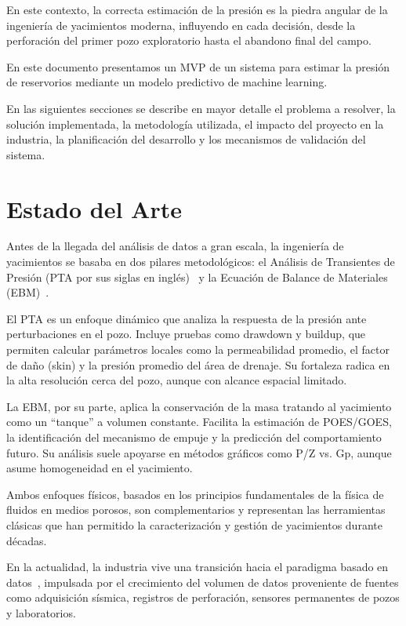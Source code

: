 \documentclass[12pt,a4paper]{article}
\begin{document}
En este contexto, la correcta estimación de la presión es la piedra angular de la ingeniería de
yacimientos moderna, influyendo en cada decisión, desde la perforación del primer pozo exploratorio hasta
el abandono final del campo.

En este documento presentamos un MVP de un sistema para estimar la presión de reservorios mediante
un modelo predictivo de machine learning.

En las siguientes secciones se describe en mayor detalle el problema a resolver, la solución implementada,
la metodología utilizada, el impacto del proyecto en la industria, la planificación del desarrollo y los
mecanismos de validación del sistema.

\newpage
\section{Estado del Arte}

Antes de la llegada del análisis de datos a gran escala, la ingeniería de yacimientos se basaba en dos
pilares metodológicos: el Análisis de Transientes de Presión (PTA por sus siglas en inglés)~\cite{pta} y la
Ecuación de Balance de Materiales (EBM)~\cite{mbe}.

El PTA es un enfoque dinámico que analiza la respuesta de la presión ante perturbaciones en el pozo.
Incluye pruebas como drawdown y buildup, que permiten calcular parámetros locales como la permeabilidad
promedio, el factor de daño (skin) y la presión promedio del área de drenaje. Su fortaleza radica en la
alta resolución cerca del pozo, aunque con alcance espacial limitado.

La EBM, por su parte, aplica la conservación de la masa tratando al yacimiento como un ``tanque'' a volumen
constante. Facilita la estimación de POES/GOES, la identificación del mecanismo de empuje y la predicción
del comportamiento futuro. Su análisis suele apoyarse en métodos gráficos como P/Z vs. Gp, aunque asume
homogeneidad en el yacimiento.

Ambos enfoques físicos, basados en los principios fundamentales de la física de fluidos en medios porosos,
son complementarios y representan las herramientas clásicas que han permitido la caracterización y gestión
de yacimientos durante décadas.

En la actualidad, la industria vive una transición hacia el paradigma basado en datos~\cite{ref5},
impulsada por el crecimiento del volumen de datos proveniente de fuentes como adquisición sísmica,
registros de perforación, sensores permanentes de pozos y laboratorios.
\end{document}
